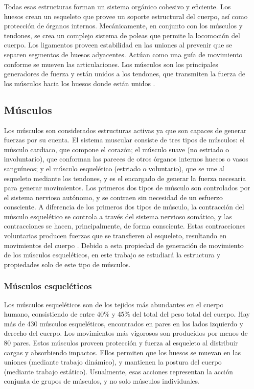 Todas esas estructuras forman un sistema orgánico cohesivo y eficiente. Los huesos crean un esqueleto que provee un soporte estructural del cuerpo, así como protección de órganos internos. Mecánicamente, en conjunto con los músculos y tendones, se crea un complejo sistema de poleas que permite la locomoción del cuerpo. Los ligamentos proveen estabilidad en las uniones al prevenir que se separen segmentos de huesos adyacentes. Actúan como una guía de movimiento conforme se mueven las articulaciones. Los músculos son los principales generadores de fuerza y están unidos a los tendones, que transmiten la fuerza de los músculos hacia los huesos donde están unidos \citep{biomechanics2012nordin}. 

\subsection{Músculos}

Los músculos son considerados estructuras activas ya que son capaces de generar fuerzas por su cuenta. El sistema muscular consiste de tres tipos de músculos: el músculo cardiaco, que compone el corazón; el músculo suave (no estriado o involuntario), que conforman las pareces de otros órganos internos huecos o vasos sanguíneos; y el músculo esquelético (estriado o voluntario), que se une al esqueleto mediante los tendones, y es el encargado de generar la fuerza necesaria para generar movimientos. Los primeros dos tipos de músculo son controlados por el sistema nervioso autónomo, y se contraen sin necesidad de un esfuerzo consciente. A diferencia de los primeros dos tipos de músculo, la contracción del músculo esquelético se controla a través del sistema nervioso somático, y las contracciones se hacen, principalmente, de forma consciente. Estas contracciones voluntarias producen fuerzas que se transfieren al esqueleto, resultando en movimientos del cuerpo \citep{biomechanics2012nordin}. Debido a esta propiedad de generación de movimiento de los músculos esqueléticos, en este trabajo se estudiará la estructura y propiedades solo de este tipo de músculos. 

\subsubsection{Músculos esqueléticos}

Los músculos esqueléticos son de los tejidos más abundantes en el cuerpo humano, consistiendo de entre 40\% y 45\% del total del peso total del cuerpo. Hay más de 430 músculos esqueléticos, encontrados en pares en los lados izquierdo y derecho del cuerpo. Los movimientos más vigorosos son producidos por menos de 80 pares. Estos músculos proveen protección y fuerza al esqueleto al distribuir cargas y absorbiendo impactos. Ellos permiten que los huesos se muevan en las uniones (mediante trabajo dinámico), y mantienen la postura del cuerpo (mediante trabajo estático). Usualmente, esas acciones representan la acción conjunta de grupos de músculos, y no solo músculos individuales.

